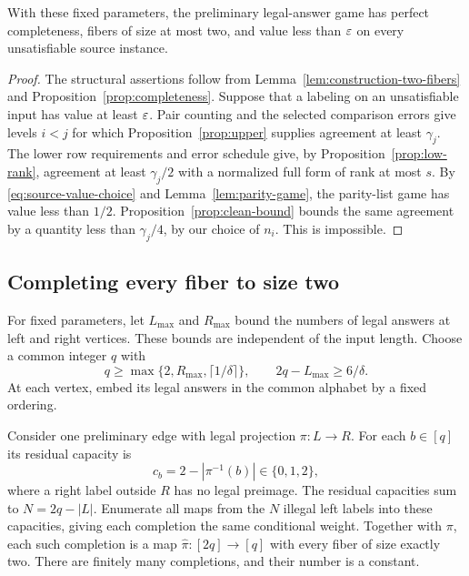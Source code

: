 \begin{proposition}\label{prop:preliminary-soundness}
With these fixed parameters, the preliminary legal-answer game has perfect
completeness, fibers of size at most two, and value less than $\varepsilon$
on every unsatisfiable source instance.
\end{proposition}
\begin{proof}
The structural assertions follow from Lemma~\ref{lem:construction-two-fibers}
and Proposition~\ref{prop:completeness}.
Suppose that a labeling on an unsatisfiable input has value at least $\varepsilon$.
Pair counting and the selected comparison errors give levels $i<j$ for which
Proposition~\ref{prop:upper} supplies agreement at least $\gamma_j$.
The lower row requirements and error schedule give, by
Proposition~\ref{prop:low-rank}, agreement at least $\gamma_j/2$
with a normalized full form of rank at most $s$.
By \eqref{eq:source-value-choice} and Lemma~\ref{lem:parity-game}, the
parity-list game has value less than $1/2$.
Proposition~\ref{prop:clean-bound} bounds the same agreement by a quantity
less than $\gamma_j/4$, by our choice of $n_i$.
This is impossible.
\end{proof}

\subsection{Completing every fiber to size two}

For fixed parameters, let $L_{\max}$ and $R_{\max}$ bound the numbers of legal
answers at left and right vertices.
These bounds are independent of the input length.
Choose a common integer $q$ with
\begin{equation}\label{eq:padding-alphabet}
 q\ge\max\{2,R_{\max},\lceil1/\delta\rceil\},
 \qquad 2q-L_{\max}\ge6/\delta.
\end{equation}
At each vertex, embed its legal answers in the common alphabet by a fixed
ordering.

Consider one preliminary edge with legal projection
$\pi:L\to R$.
For each $b\in[q]$ its residual capacity is
\[
              c_b=2-|\pi^{-1}(b)|\in\{0,1,2\},
\]
where a right label outside $R$ has no legal preimage.
The residual capacities sum to $N=2q-|L|$.
Enumerate all maps from the $N$ illegal left labels into these capacities,
giving each completion the same conditional weight.
Together with $\pi$, each such completion is a map
$\widehat\pi:[2q]\to[q]$ with every fiber of size exactly two.
There are finitely many completions, and their number is a constant.

